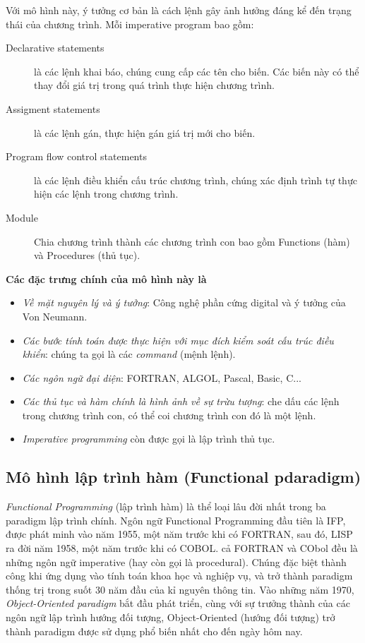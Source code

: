 \documentclass[10pt, a4paper]{article}
\begin{document}
Với mô hình này, ý tưởng cơ bản là cách lệnh gây ảnh hưởng đáng kể đến trạng thái của chương trình. Mỗi imperative program bao gồm:
\begin{description}
\item [Declarative statements] là các lệnh khai báo, chúng cung cấp các tên cho biến. Các biến này có thể thay đổi giá trị trong quá trình thực hiện chương trình.
\item [Assigment statements] là các lệnh gán, thực hiện gán giá trị mới cho biến.
\item [Program flow control statements] là các lệnh điều khiển cấu trúc chương trình, chúng xác định trình tự thực hiện các lệnh trong chương trình.
\item [Module] Chia chương trình thành các chương trình con bao gồm \textsf{Functions} (hàm) và \textsf{Procedures} (thủ tục).
\end{description}
\textbf{Các đặc trưng chính của mô hình này là}
\begin{itemize}
\item \textit{Về mặt nguyên lý và ý tưởng}: Công nghệ phần cứng digital và ý tưởng của Von Neumann.
\item \textit{Các bước tính toán được thực hiện với mục đích kiểm soát cấu trúc điều khiển}: chúng ta gọi là các \emph{command} (mệnh lệnh).
\item \textit{Các ngôn ngữ đại diện}: FORTRAN, ALGOL, Pascal, Basic, C...
\item \textit{Các thủ tục và hàm chính là hình ảnh về sự trừu tượng}: che dấu các lệnh trong chương trình con, có thể coi chương trình con đó là một lệnh.
\item \emph{Imperative programming} còn được gọi là lập trình thủ tục.
\end{itemize}

\subsection{Mô hình lập trình hàm (Functional pdaradigm)}

\emph{Functional Programming} (lập trình hàm) là thể loại lâu đời nhất trong ba paradigm lập trình chính. Ngôn ngữ Functional Programming đầu tiên là IFP, được phát minh vào năm 1955, một năm trước khi có FORTRAN, sau đó, LISP ra đời năm 1958, một năm trước khi có COBOL. cả FORTRAN và CObol đều là những ngôn ngữ imperative (hay còn gọi là procedural). Chúng đặc biệt thành công khi ứng dụng vào tính toán khoa học và nghiệp vụ, và trở thành paradigm thống trị trong suốt 30 năm đầu của kỉ nguyên thông tin. Vào những năm 1970, \emph{Object-Oriented paradigm} bắt đầu phát triển, cùng với sự trưởng thành của các ngôn ngữ lập trình hướng đối tượng, Object-Oriented (hướng đối tượng) trở thành paradigm được sử dụng phổ biến nhất cho đến ngày hôm nay.
\end{document}
